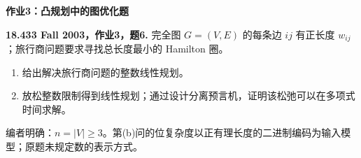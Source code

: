 \par\addvspace{7pt}\noindent\textbf{作业3：凸规划中的图优化题}

\begin{exercise}\label{mit:18433-a3-q6}
\textbf{18.433 Fall 2003，作业3，题6.}
完全图 $G=(V,E)$ 的每条边 $ij$ 有正长度 $w_{ij}$；旅行商问题要求寻找总长度最小的 Hamilton 圈。
\begin{enumerate}[label=(\alph*)]
\item 给出解决旅行商问题的整数线性规划。
\item 放松整数限制得到线性规划；通过设计分离预言机，证明该松弛可以在多项式时间求解。
\end{enumerate}
编者明确：$n=|V|\ge3$。第(b)问的位复杂度以正有理长度的二进制编码为输入模型；原题未规定数的表示方式。
\end{exercise}
